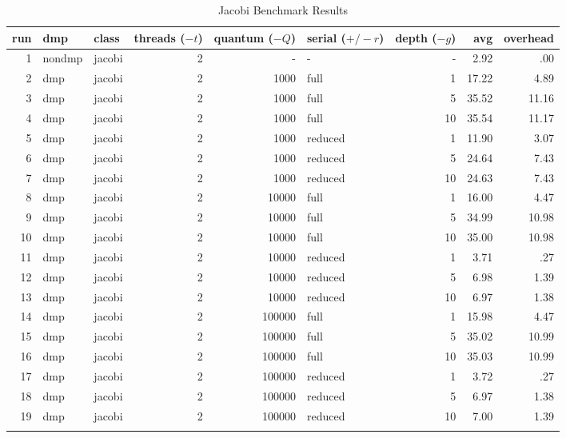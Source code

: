 \begin{center}
\begin{small}
\begin{longtable}{rllrrlrrr}
\hline
run & dmp & class & threads ($-t$) & quantum ($-Q$) & serial ($+/-r$) & depth ($-g$) & avg & overhead\\
\hline
 1 & nondmp & jacobi & 2 & - & - & - & 2.92 & .00\\
 2 & dmp & jacobi & 2 & 1000 & full & 1 & 17.22 & 4.89\\
 3 & dmp & jacobi & 2 & 1000 & full & 5 & 35.52 & 11.16\\
 4 & dmp & jacobi & 2 & 1000 & full & 10 & 35.54 & 11.17\\
 5 & dmp & jacobi & 2 & 1000 & reduced & 1 & 11.90 & 3.07\\
 6 & dmp & jacobi & 2 & 1000 & reduced & 5 & 24.64 & 7.43\\
 7 & dmp & jacobi & 2 & 1000 & reduced & 10 & 24.63 & 7.43\\
 8 & dmp & jacobi & 2 & 10000 & full & 1 & 16.00 & 4.47\\
 9 & dmp & jacobi & 2 & 10000 & full & 5 & 34.99 & 10.98\\
10 & dmp & jacobi & 2 & 10000 & full & 10 & 35.00 & 10.98\\
11 & dmp & jacobi & 2 & 10000 & reduced & 1 & 3.71 & .27\\
12 & dmp & jacobi & 2 & 10000 & reduced & 5 & 6.98 & 1.39\\
13 & dmp & jacobi & 2 & 10000 & reduced & 10 & 6.97 & 1.38\\
14 & dmp & jacobi & 2 & 100000 & full & 1 & 15.98 & 4.47\\
15 & dmp & jacobi & 2 & 100000 & full & 5 & 35.02 & 10.99\\
16 & dmp & jacobi & 2 & 100000 & full & 10 & 35.03 & 10.99\\
17 & dmp & jacobi & 2 & 100000 & reduced & 1 & 3.72 & .27\\
18 & dmp & jacobi & 2 & 100000 & reduced & 5 & 6.97 & 1.38\\
19 & dmp & jacobi & 2 & 100000 & reduced & 10 & 7.00 & 1.39\\
\hline
\caption{Jacobi Benchmark Results}
\label{tab:jacobi_results}
\end{longtable}
\end{small}
\end{center}

